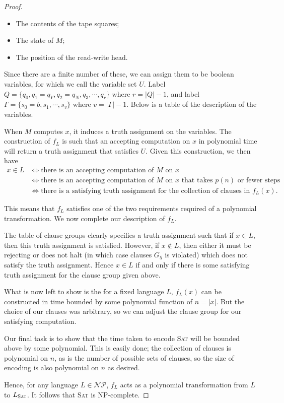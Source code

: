\begin{proof}
    \begin{itemize}
        \item The contents of the tape squares;
        \item The state of $M$;
        \item The position of the read-write head.
    \end{itemize}

    Since there are a finite number of these, we can assign them to be boolean variables, for which we call the variable set $U$. Label $Q = \{q_0,q_1= q_Y, q_2 = q_N, q_3, \cdots , q_r\}$ where $r = |Q| -1$, and label $\Gamma = \{s_0 = b,s_1,\cdots,s_v\}$ where $v = |\Gamma| - 1$. Below is a table of the description of the variables.

    
    
    When $M$ computes $x$, it induces a truth assignment on the variables. The construction of $f_L$ is such that an accepting computation on $x$ in polynomial time will return a truth assignment that satisfies $U$. Given this construction, we then have
    \begin{align*}
        x \in L &\iff \text{there is an accepting computation of $M$ on $x$}\\
        &\iff \text{there is an accepting computation of $M$ on $x$ that takes $p(n)$ or fewer steps}\\
        &\iff \text{there is a satisfying truth assignment for the collection of clauses in $f_L(x)$.}
    \end{align*}

    This means that $f_L$ satisfies one of the two requirements required of a polynomial transformation. We now complete our description of $f_L$.

    

    The table of clause groups clearly specifies a truth assignment such that if $x \in L$, then this truth assignment is satisfied. However, if $x \notin L$, then either it must be rejecting or does not halt (in which case clauses $G_5$ is violated) which does not satisfy the truth assignment. Hence $x \in L$ if and only if there is some satisfying truth assignment for the clause group given above.

    What is now left to show is the for a fixed language $L$, $f_L(x)$ can be constructed in time bounded by some polynomial function of $n = |x|$. But the choice of our clauses was arbitrary, so we can adjust the clause group for our satisfying computation.
 
    Our final task is to show that the time taken to encode \textsc{Sat} will be bounded above by some polynomial. This is easily done; the collection of clauses is polynomial on $n$, as is the number of possible sets of clauses, so the size of encoding is also polynomial on $n$ as desired.

    Hence, for any language $L \in \mathcal{NP}$, $f_L$ acts as a polynomial transformation from $L$ to $L_{\textsc{Sat}}$. It follows that \textsc{Sat} is NP-complete.
\end{proof}